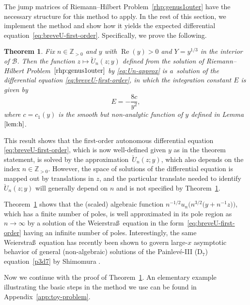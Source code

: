 \documentclass[11pt]{article}
\numberwithin{equation}{section}
\numberwithin{equation}{section}
\newtheorem{Theorem}{Theorem}[section]
\begin{document}
The jump matrices of Riemann--Hilbert Problem~\ref{rhp:genus1outer} have the necessary structure for this method to apply. In the rest of this section, we implement the method and show how it yields the expected differential equation~\eqref{eq:breveU-first-order}. Specifically, we prove the following.
\begin{Theorem}\label{thm:main-goal}
Fix $n\in\mathbb{Z}_{>0}$ and $y$ with $\operatorname{Re}(y)>0$ and $Y=y^{1/3}$ in the
interior of $\mathcal{B}$. Then the function $z\mapsto \breve{U}_n(z;y)$ defined
from the solution of Riemann--Hilbert Problem~$\ref{rhp:genus1outer}$ by
\eqref{eq:Un-approx} is a~solution of the differential equation
\eqref{eq:breveU-first-order}, in which the integration constant $E$ is given by
\begin{equation}
E=-\frac{8c}{y^2},
\label{eq:Ec}
\end{equation}
where $c=c_1(y)$ is the smooth but non-analytic function of $y$ defined in Lemma~$\ref{lem:h}$.
\end{Theorem}

\begin{Remark}
This result shows that the first-order autonomous differential equation
\eqref{eq:breveU-first-order}, which is now well-defined given $y$ as in the theorem
statement, is solved by the approximation~$\breve{U}_n(z;y)$, which also depends on
the index $n\in\mathbb{Z}_{>0}$. However, the space of solutions of the differential
equation is mapped out by translations in $z$, and the particular translate needed to
identify $\breve{U}_n(z;y)$ will generally depend on $n$ and is not specified by
Theorem~\ref{thm:main-goal}.
\end{Remark}

\begin{Remark}
Theorem~\ref{thm:main-goal} shows that the (scaled) algebraic function
$n^{-1/2}u_n\bigl(n^{3/2}\bigl(y+n^{-1}z\bigr)\bigr)$, which has a finite number of poles, is well approximated in
its pole region as $n\to\infty$ by a solution of the Weierstra\ss\ equation
in the form~\eqref{eq:breveU-first-order} having an infinite number of poles. Interestingly, the same Weierstra\ss\ equation has
recently been shown to govern large-$x$ asymptotic behavior of general (non-algebraic)
solutions of the Painlev\'e-III (D$_7$) equation~\eqref{p3d7} by Shimomura
\cite{Shimomura:2022}.
\end{Remark}

Now we continue with the proof of Theorem~\ref{thm:main-goal}. An elementary example illustrating the basic steps in the method we use can be found in Appendix~\ref{app:toy-problem}.
\end{document}
